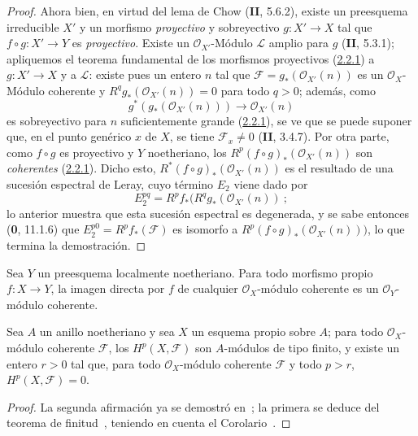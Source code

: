 \begin{proof}
Ahora bien, en virtud del lema de Chow (\textbf{II}, 5.6.2), existe un preesquema
irreducible $X'$ y un morfismo \emph{proyectivo} y sobreyectivo
$g:X'\to X$ tal que $f\circ g:X'\to Y$ es \emph{proyectivo}. Existe un
$\mathcal O_{X'}$-Módulo $\mathcal L$ amplio para $g$ (\textbf{II}, 5.3.1);
apliquemos el teorema fundamental de los morfismos proyectivos
(\hyperref[III.2.2.1-fr]{2.2.1}) a $g:X'\to X$ y a $\mathcal L$:
existe pues un entero $n$ tal que
$\mathcal F=g_*(\mathcal O_{X'}(n))$ es un $\mathcal O_X$-Módulo coherente
y $R^qg_*(\mathcal O_{X'}(n))=0$ para todo $q>0$; además, como
\[
g^*(g_*(\mathcal O_{X'}(n)))\longrightarrow\mathcal O_{X'}(n)
\]
es sobreyectivo para $n$ suficientemente grande (\hyperref[III.2.2.1-fr]{2.2.1}), se
ve que se puede suponer que, en el punto genérico $x$ de $X$, se tiene
$\mathcal F_x\neq0$ (\textbf{II}, 3.4.7). Por otra parte, como $f\circ g$ es
proyectivo y $Y$ noetheriano, los
$R^p(f\circ g)_*(\mathcal O_{X'}(n))$ son \emph{coherentes}
(\hyperref[III.2.2.1-fr]{2.2.1}). Dicho esto,
$R^*(f\circ g)_*(\mathcal O_{X'}(n))$ es el resultado de una sucesión
espectral de Leray, cuyo término $E_2$ viene dado por
\[
E_2^{pq}=R^pf_*(R^qg_*(\mathcal O_{X'}(n))~;
\]
lo anterior muestra que esta sucesión espectral es degenerada, y se sabe
entonces (\textbf{0}, 11.1.6) que $E_2^{p0}=R^pf_*(\mathcal F)$ es isomorfo a
$R^p(f\circ g)_*(\mathcal O_{X'}(n)))$, lo que termina la demostración.
\end{proof}

\begin{corollary}[3.2.2]
\label{III.3.2.2}
\label{III.3.2.2-fr}
Sea $Y$ un preesquema localmente noetheriano.
Para todo morfismo propio $f:X\to Y$, la imagen directa por $f$ de cualquier $\mathcal O_X$-módulo coherente es un $\mathcal O_Y$-módulo coherente.
\end{corollary}

\begin{corollary}[3.2.3]
\label{III.3.2.3}
\label{III.3.2.3-fr}
Sea $A$ un anillo noetheriano y sea $X$ un esquema propio sobre $A$; para todo $\mathcal O_X$-módulo coherente $\mathcal F$, los $H^p(X,\mathcal F)$ son $A$-módulos de tipo finito, y existe un entero $r>0$ tal que, para todo $\mathcal O_X$-módulo coherente $\mathcal F$ y todo $p>r$, $H^p(X,\mathcal F)=0$.
\end{corollary}

\begin{proof}
La segunda afirmación ya se demostró en~; la primera se deduce del teorema de finitud~, teniendo en cuenta el Corolario~.
\end{proof}

